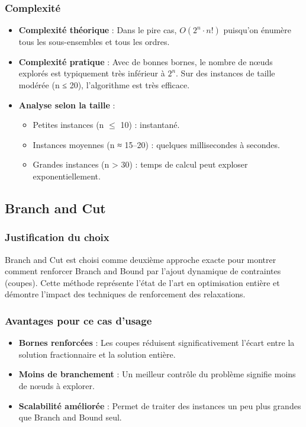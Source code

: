 \documentclass[11pt,a4paper]{article}
\begin{document}
\subsubsection*{Complexité}

\begin{itemize}
    \item \textbf{Complexité théorique} : Dans le pire cas, $O(2^n \cdot n!)$ puisqu'on énumère tous les sous-ensembles et tous les ordres.
    \item \textbf{Complexité pratique} : Avec de bonnes bornes, le nombre de nœuds explorés est typiquement très inférieur à $2^n$. Sur des instances de taille modérée (n ≤ 20), l'algorithme est très efficace.
    \item \textbf{Analyse selon la taille} :
    \begin{itemize}
        \item Petites instances (n $\le$ 10) : instantané.
        \item Instances moyennes (n ≈ 15–20) : quelques millisecondes à secondes.
        \item Grandes instances (n > 30) : temps de calcul peut exploser exponentiellement.
    \end{itemize}
\end{itemize}


\subsection{Branch and Cut}

\subsubsection*{Justification du choix}

Branch and Cut est choisi comme deuxième approche exacte pour montrer comment renforcer Branch and Bound par l'ajout dynamique de contraintes (coupes). Cette méthode représente l'état de l'art en optimisation entière et démontre l'impact des techniques de renforcement des relaxations.

\subsubsection*{Avantages pour ce cas d'usage}

\begin{itemize}
    \item \textbf{Bornes renforcées} : Les coupes réduisent significativement l'écart entre la solution fractionnaire et la solution entière.
    \item \textbf{Moins de branchement} : Un meilleur contrôle du problème signifie moins de nœuds à explorer.
    \item \textbf{Scalabilité améliorée} : Permet de traiter des instances un peu plus grandes que Branch and Bound seul.
\end{itemize}
\end{document}

